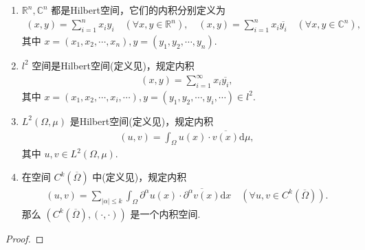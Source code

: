 \documentclass[../../main.tex]{subfiles}%
\begin{document}
\begin{proposition}
\begin{enumerate}[(1)]
\item $\mathbb{R}^n,\mathbb{C}^n$ 都是Hilbert空间，它们的内积分别定义为
\begin{align*}
(x,y)=\sum\limits_{i=1}^n x_iy_i\quad(\forall x,y\in\mathbb{R}^n),
\quad
(x,y)=\sum\limits_{i=1}^n x_i\overline{y_i}\quad(\forall x,y\in\mathbb{C}^n),
\end{align*}
其中 $x=(x_1,x_2,\cdots,x_n),y=(y_1,y_2,\cdots,y_n)$.

\item $l^2$ 空间是Hilbert空间(定义见)，规定内积
\begin{align*}
(x,y)=\sum\limits_{i=1}^\infty x_i\overline{y_i},
\end{align*}
其中 $x=(x_1,x_2,\cdots,x_i,\cdots),y=(y_1,y_2,\cdots,y_i,\cdots)\in l^2$.

\item $L^2(\Omega,\mu)$ 是Hilbert空间(定义见)，规定内积
\begin{align*}
(u,v)=\int_\Omega u(x)\cdot\overline{v(x)}\mathrm{d}\mu,
\end{align*}
其中 $u,v\in L^2(\Omega,\mu)$.

\item 在空间 $C^k(\overline{\Omega})$ 中(定义见)，规定内积
\begin{align*}
(u,v)=\sum\limits_{|\alpha|\leqslant k}\int_\Omega \partial^\alpha u(x)\cdot\overline{\partial^\alpha v(x)}\mathrm{d}x\quad(\forall u,v\in C^k(\overline{\Omega})).
\end{align*}
那么 $(C^k(\overline{\Omega}),(\cdot,\cdot))$ 是一个内积空间.
\end{enumerate}
\end{proposition}
\begin{proof}


\end{proof}
\end{document}
